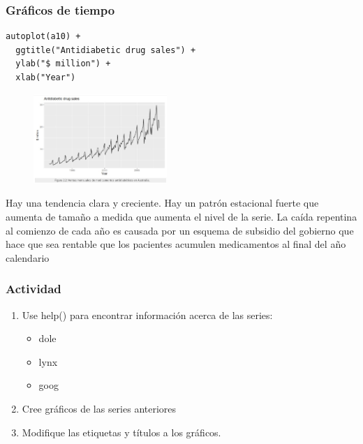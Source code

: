 \documentclass[10pt]{beamer}
\begin{document}
\begin{frame}[fragile]
\frametitle{Gráficos de tiempo}


\lstset{language=r,label= ,caption= ,captionpos=b,numbers=none}
\begin{lstlisting}
autoplot(a10) +
  ggtitle("Antidiabetic drug sales") +
  ylab("$ million") +
  xlab("Year")
\end{lstlisting}

\pause


\begin{figure}
\begin{center}
    \includegraphics[width=0.45\textwidth]{Imagen14.JPG}
\end{center}
\end{figure}

\pause

{\scriptsize
Hay una tendencia clara y creciente. Hay un patrón estacional fuerte que aumenta de tamaño a medida que aumenta el nivel de la serie. La caída repentina al comienzo de cada año es causada por un esquema de subsidio del gobierno que hace que sea rentable que los pacientes acumulen medicamentos al final del año calendario
}

\end{frame}






\begin{frame}[fragile]
\frametitle{Actividad}

\begin{enumerate}
\item Use help() para encontrar información acerca de las series:

\begin{itemize}
\item dole
\item lynx
\item goog
\end{itemize}

\item Cree gráficos de las series anteriores

\item Modifique las etiquetas y títulos a los gráficos.
\end{enumerate}


\end{frame}
\end{document}
